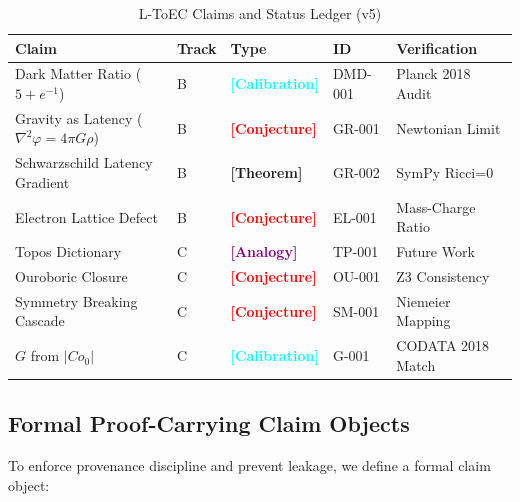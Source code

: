 \documentclass[11pt,titlepage]{article}
\newcommand{\tagtheo}{\textcolor{green!60!black}{\textbf{[Theorem]}} }
\newcommand{\tagconj}{\textcolor{red}{\textbf{[Conjecture]}} }
\newcommand{\taganal}{\textcolor{purple}{\textbf{[Analogy]}} }
\newcommand{\tagcal}{\textcolor{cyan}{\textbf{[Calibration]}} }
\begin{document}
\begin{table}[h!]
\centering
\begin{tabular}{@{}lllll@{}}
\toprule
\textbf{Claim} & \textbf{Track} & \textbf{Type} & \textbf{ID} & \textbf{Verification} \\ \midrule
Dark Matter Ratio ($5+e^{-1}$) & B & \tagcal & DMD-001 & Planck 2018 Audit \\
Gravity as Latency ($\nabla^2 \varphi = 4\pi G \rho$) & B & \tagconj & GR-001 & Newtonian Limit \\
Schwarzschild Latency Gradient & B & \tagtheo & GR-002 & SymPy Ricci=0 \\
Electron Lattice Defect & B & \tagconj & EL-001 & Mass-Charge Ratio \\
Topos Dictionary & C & \taganal & TP-001 & Future Work \\
Ouroboric Closure & C & \tagconj & OU-001 & Z3 Consistency \\
Symmetry Breaking Cascade & C & \tagconj & SM-001 & Niemeier Mapping \\
$G$ from $|Co_0|$ & C & \tagcal & G-001 & CODATA 2018 Match \\ \bottomrule
\end{tabular}
\caption{L-ToEC Claims and Status Ledger (v5)}
\end{table}





\subsection{Formal Proof-Carrying Claim Objects}

To enforce provenance discipline and prevent leakage, we define a formal claim object:
\end{document}

